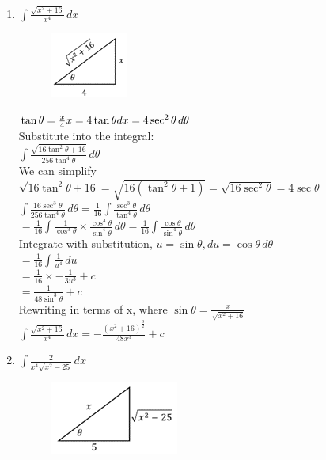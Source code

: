 \documentclass[../main.tex]{subfiles}
\begin{document}
\begin{enumerate}
    \item 
    \(\int \frac{\sqrt{x^2+16}}{x^4}\,dx\)
    \begin{figure}[h]
        \includegraphics{images/trigsuba4.png}
    \end{figure}

    \(\tan{\theta}=\frac{x}{4}\\
    x=4\tan{\theta}\\
    dx=4\sec^2{\theta}\,d\theta\)\\

    Substitute into the integral:\\
    \(\int \frac{\sqrt{16\tan^2{\theta}+16}}{256\tan^4{\theta}}\,d\theta\)\\

    We can simplify \(\sqrt{16\tan^2{\theta}+16}=\sqrt{16(\tan^2{\theta}+1)}=\sqrt{16\sec^2{\theta}}=4\sec{\theta}\)\\
    
    \(\int \frac{16\sec^3{\theta}}{256\tan^4{\theta}}\,d\theta=\frac{1}{16}\int \frac{\sec^3{\theta}}{\tan^4{\theta}}\,d\theta\)\\

    \(=\frac{1}{16}\int \frac{1}{\cos^3{\theta}}\times \frac{\cos^4{\theta}}{\sin^4{\theta}}\,d\theta=\frac{1}{16}\int \frac{\cos{\theta}}{\sin^4{\theta}}\,d\theta\)\\

    Integrate with substitution, \(u=\sin{\theta}, du=\cos{\theta}\,d\theta\)\\
    \(=\frac{1}{16}\int \frac{1}{u^4}\,du\)\\

    \(=\frac{1}{16}\times -\frac{1}{3u^3}+c\)\\

    \(=\frac{1}{48\sin^3{\theta}}+c\)\\

    Rewriting in terms of x, where \(\sin{\theta}=\frac{x}{\sqrt{x^2+16}}\)\\
    \(\int \frac{\sqrt{x^2+16}}{x^4}\,dx=-\frac{(x^2+16)^\frac{3}{2}}{48x^3}+c\)\\

    \item 
    \(\int \frac{2}{x^4\sqrt{x^2-25}}\,dx\)
    \begin{figure}[h]
        \includegraphics{images/trigsuba5.png}
    \end{figure}


\end{enumerate}
\end{document}
